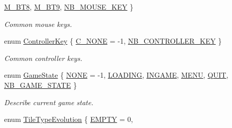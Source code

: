 \begin{DoxyCompactItemize}
\hyperlink{namespacearcade_a41017b6e882fbcad335f303c7950e4bfacf34629bf429980b0a0750dd309027bc}{M\+\_\+\+B\+T8}, 
\hyperlink{namespacearcade_a41017b6e882fbcad335f303c7950e4bfa9a35ff4a55b0a513fb992ea8979c9cd0}{M\+\_\+\+B\+T9}, 
\newline
\hyperlink{namespacearcade_a41017b6e882fbcad335f303c7950e4bfae614aa4e235624c62b2fd71593ab711d}{N\+B\+\_\+\+M\+O\+U\+S\+E\+\_\+\+K\+EY}
 \}\begin{DoxyCompactList}\small\item\em Common mouse keys. \end{DoxyCompactList}
\item 
enum \hyperlink{namespacearcade_a4281850c2b4199c96efad8ba85f8aa21}{Controller\+Key} \{ \hyperlink{namespacearcade_a4281850c2b4199c96efad8ba85f8aa21acfcf046358333e389465ed0c140bae30}{C\+\_\+\+N\+O\+NE} = -\/1, 
\hyperlink{namespacearcade_a4281850c2b4199c96efad8ba85f8aa21a8f6a3cbe8494541cbdbec345d0885a01}{N\+B\+\_\+\+C\+O\+N\+T\+R\+O\+L\+L\+E\+R\+\_\+\+K\+EY}
 \}\begin{DoxyCompactList}\small\item\em Common controller keys. \end{DoxyCompactList}
\item 
enum \hyperlink{namespacearcade_a6adca89ee2f539b03980c7e59b044ed7}{Game\+State} \{ \newline
\hyperlink{namespacearcade_a6adca89ee2f539b03980c7e59b044ed7a5b39bcf8f6b63d13235acb792626ac86}{N\+O\+NE} = -\/1, 
\hyperlink{namespacearcade_a6adca89ee2f539b03980c7e59b044ed7ab01abc5a722b76bf5d58e2222c0bbb47}{L\+O\+A\+D\+I\+NG}, 
\hyperlink{namespacearcade_a6adca89ee2f539b03980c7e59b044ed7a166c2147c053cf4d559e2b0523f27aab}{I\+N\+G\+A\+ME}, 
\hyperlink{namespacearcade_a6adca89ee2f539b03980c7e59b044ed7a3b05fb118b02b52c4ca3985e444b4a07}{M\+E\+NU}, 
\newline
\hyperlink{namespacearcade_a6adca89ee2f539b03980c7e59b044ed7afd476b9f26a353509f4d9bb3850cc268}{Q\+U\+IT}, 
\hyperlink{namespacearcade_a6adca89ee2f539b03980c7e59b044ed7ab5eddfc711a2e35508d51c1ce010ad6f}{N\+B\+\_\+\+G\+A\+M\+E\+\_\+\+S\+T\+A\+TE}
 \}\begin{DoxyCompactList}\small\item\em Describe current game state. \end{DoxyCompactList}
\item 
enum \hyperlink{namespacearcade_a2e0a64a64203f78c9efb84a1475a8cf4}{Tile\+Type\+Evolution} \{ \newline
\hyperlink{namespacearcade_a2e0a64a64203f78c9efb84a1475a8cf4a2b0cc51eb307f5d5a6f831654e07633b}{E\+M\+P\+TY} = 0, 

\end{DoxyCompactItemize}
